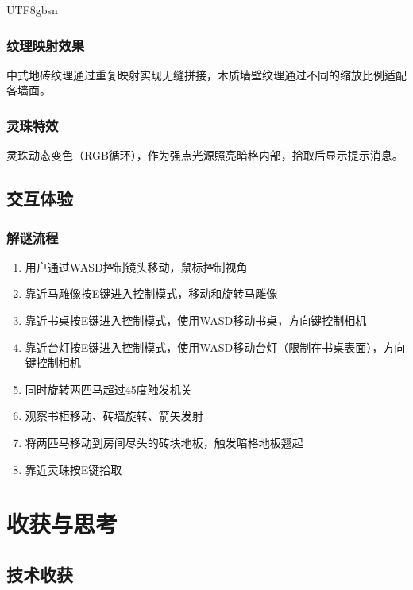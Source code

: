 \documentclass{article}
\begin{document}
\begin{CJK}{UTF8}{gbsn}
\subsubsection{纹理映射效果}
中式地砖纹理通过重复映射实现无缝拼接，木质墙壁纹理通过不同的缩放比例适配各墙面。

\subsubsection{灵珠特效}
灵珠动态变色（RGB循环），作为强点光源照亮暗格内部，拾取后显示提示消息。

\subsection{交互体验}

\subsubsection{解谜流程}
\begin{enumerate}
    \item 用户通过WASD控制镜头移动，鼠标控制视角
    \item 靠近马雕像按E键进入控制模式，移动和旋转马雕像
    \item 靠近书桌按E键进入控制模式，使用WASD移动书桌，方向键控制相机
    \item 靠近台灯按E键进入控制模式，使用WASD移动台灯（限制在书桌表面），方向键控制相机
    \item 同时旋转两匹马超过45度触发机关
    \item 观察书柜移动、砖墙旋转、箭矢发射
    \item 将两匹马移动到房间尽头的砖块地板，触发暗格地板翘起
    \item 靠近灵珠按E键拾取
\end{enumerate}

\section{收获与思考}

\subsection{技术收获}


\end{CJK}
\end{document}
